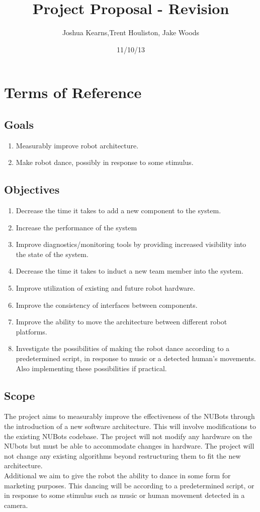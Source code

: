 \documentclass[a4paper]{article}
\title{Project Proposal - Revision}
\author{Joshua Kearns,Trent Houliston, Jake Woods}
\date{11/10/13}
\begin{document}
	\maketitle
	
	\clearpage
	\tableofcontents
	\clearpage

	\section{Terms of Reference}
		\subsection {Goals}
			\begin{enumerate}
				\item Measurably improve robot architecture.
				\item Make robot dance, possibly in response to some stimulus.
			\end{enumerate}
		\subsection {Objectives}
			\begin{enumerate}
				\item Decrease the time it takes to add a new component to the system.
				\item Increase the performance of the system
				\item Improve diagnostics/monitoring tools by providing increased visibility into the state of the system.
				\item Decrease the time it takes to induct a new team member into the system.
				\item Improve utilization of existing and future robot hardware.
				\item Improve the consistency of interfaces between components.
				\item Improve the ability to move the architecture between different robot platforms.
				\item Investigate the possibilities of making the robot dance according to a predetermined script, in response to music or a detected human’s movements. Also implementing these possibilities if practical.
			\end{enumerate}
		\subsection {Scope}
			The project aims to measurably improve the effectiveness of the NUBots through the introduction of a new software architecture. This will involve modifications to the existing NUBots codebase. The project will not modify any hardware on the NUbots but must be able to accommodate changes in hardware. The project will not change any existing algorithms beyond restructuring them to fit the new architecture.
			\\Additional we aim to give the robot the ability to dance in some form for marketing purposes. This dancing will be according to a predetermined script, or in response to some stimulus such as music or human movement detected in a camera.
\end{document}
